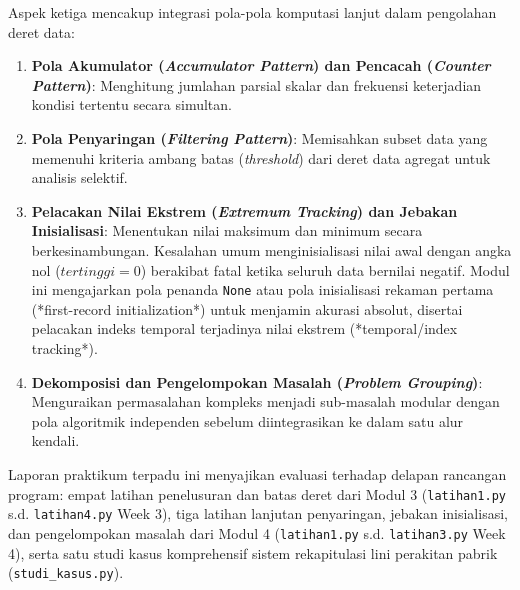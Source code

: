 \documentclass[12pt,a4paper]{article}
\begin{document}
Aspek ketiga mencakup integrasi pola-pola komputasi lanjut dalam pengolahan deret data:
\begin{enumerate}
    \item \textbf{Pola Akumulator (\textit{Accumulator Pattern}) dan Pencacah (\textit{Counter Pattern})}: Menghitung jumlahan parsial skalar dan frekuensi keterjadian kondisi tertentu secara simultan.
    \item \textbf{Pola Penyaringan (\textit{Filtering Pattern})}: Memisahkan subset data yang memenuhi kriteria ambang batas (\textit{threshold}) dari deret data agregat untuk analisis selektif.
    \item \textbf{Pelacakan Nilai Ekstrem (\textit{Extremum Tracking}) dan Jebakan Inisialisasi}: Menentukan nilai maksimum dan minimum secara berkesinambungan. Kesalahan umum menginisialisasi nilai awal dengan angka nol ($tertinggi = 0$) berakibat fatal ketika seluruh data bernilai negatif. Modul ini mengajarkan pola penanda \texttt{None} atau pola inisialisasi rekaman pertama (*first-record initialization*) untuk menjamin akurasi absolut, disertai pelacakan indeks temporal terjadinya nilai ekstrem (*temporal/index tracking*).
    \item \textbf{Dekomposisi dan Pengelompokan Masalah (\textit{Problem Grouping})}: Menguraikan permasalahan kompleks menjadi sub-masalah modular dengan pola algoritmik independen sebelum diintegrasikan ke dalam satu alur kendali.
\end{enumerate}

Laporan praktikum terpadu ini menyajikan evaluasi terhadap delapan rancangan program: empat latihan penelusuran dan batas deret dari Modul 3 (\texttt{latihan1.py} s.d. \texttt{latihan4.py} Week 3), tiga latihan lanjutan penyaringan, jebakan inisialisasi, dan pengelompokan masalah dari Modul 4 (\texttt{latihan1.py} s.d. \texttt{latihan3.py} Week 4), serta satu studi kasus komprehensif sistem rekapitulasi lini perakitan pabrik (\texttt{studi\_kasus.py}).
\end{document}

